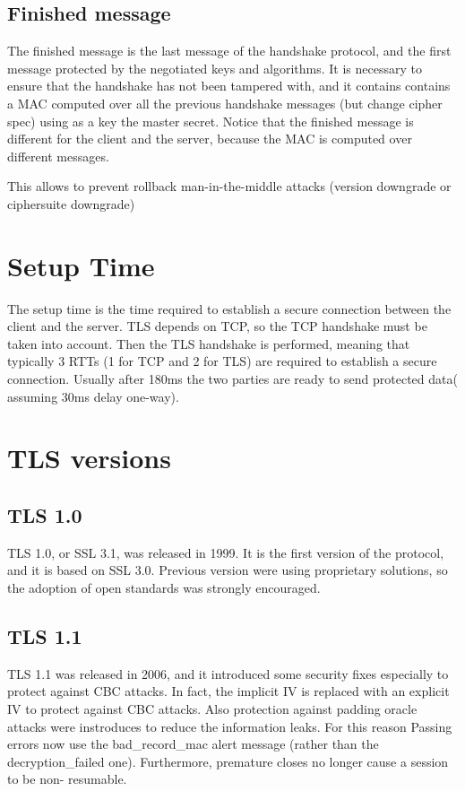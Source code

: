 \subsection{Finished message}
The finished message is the last message of the handshake protocol,
and the first message protected by the negotiated keys and algorithms.
It is necessary to ensure that the handshake has not been tampered
with, and it contains contains a MAC computed over all the previous
handshake messages (but change cipher spec) using as a key the master
secret. Notice that the finished message is different for the client 
and the server, because the MAC is computed over different messages.

This allows to prevent rollback man-in-the-middle attacks (version
downgrade or ciphersuite downgrade)

\section{Setup Time}
The setup time is the time required to establish a secure connection 
between the client and the server. TLS depends on TCP, so the TCP
handshake must be taken into account. Then the TLS handshake is
performed, meaning that typically 3 RTTs (1 for TCP and 2 for TLS) are
required to establish a secure connection. Usually after 180ms the two
parties are ready to send protected data( assuming 30ms delay
one-way).

\section{TLS versions}
\subsection{TLS 1.0}
TLS 1.0, or SSL 3.1, was released in 1999. It is the first version of
the protocol, and it is based on SSL 3.0. Previous version were using
proprietary solutions, so the adoption of open standards was strongly
encouraged.

\subsection{TLS 1.1}
TLS 1.1 was released in 2006, and it introduced some security fixes
especially to protect against CBC attacks. In fact, the implicit
IV is replaced with an explicit IV to protect against CBC attacks.
Also protection against padding oracle attacks were instroduces to
reduce the information leaks. For this reason Passing errors now use
the bad\_record\_mac alert message (rather than the decryption\_failed
one). Furthermore, premature closes no longer cause a session to be non-
resumable.

